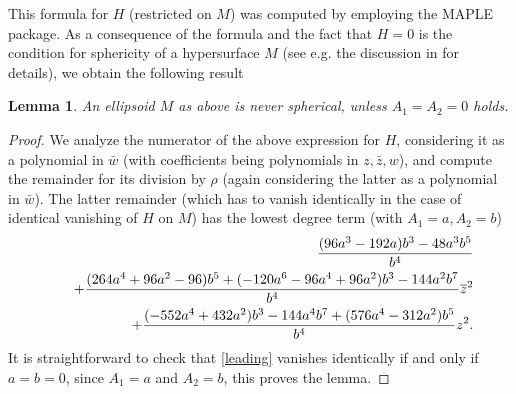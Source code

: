 \documentclass[12pt]{amsart}
\newtheorem{lemma}{Lemma}[section]
\def\beq{\begin{equation}}
\def\eeq{\end{equation}}
\begin{document}
This formula for $H$ (restricted on $M$) was computed by employing the MAPLE package. As a consequence of the formula and the fact that $H=0$ is the condition for sphericity of a hypersurface $M$ (see e.g. the discussion in  \cite{nonanalytic,KZ2} for details), we obtain the following result

\begin{lemma}\label{spherical}
An ellipsoid $M$ as above is never spherical, unless $A_1=A_2=0$ holds.
\end{lemma}
\begin{proof}
We analyze the numerator of the above expression for $H$, considering it as a polynomial in $\bar w$ (with coefficients being polynomials in $z,\bar z,w$), and compute the remainder  for its division by $\rho$ (again considering the latter as a polynomial in $\bar w$). 
The latter remainder (which has to vanish identically in the case of identical vanishing of $H$ on $M$) has the lowest degree term (with $A_1=a, A_2=b$)
\begin{eqnarray}\label{leading}
&&\quad {(96a^3-192a)b^3-48a^3b^5\over b^4}\\
&&\quad+\frac{(264 a^4+96 a^2-96) b^5
+(-120 a^6-96 a^4+96 a^2) b^3-144 a^2 b^7} {b^4}\overline{z}^2 \nonumber \\
&&\quad+\frac{(-552 a^4+432 a^2) b^3-144 a^4 b^7+(576 a^4-312 a^2) b^5}{b^4}z^2.\nonumber
\end{eqnarray} 
It is straightforward to check that \eqref{leading} vanishes identically if and only if $a=b=0$, since $A_1=a$ and $A_2=b$,  this proves the lemma.
\end{proof}
\end{document}
